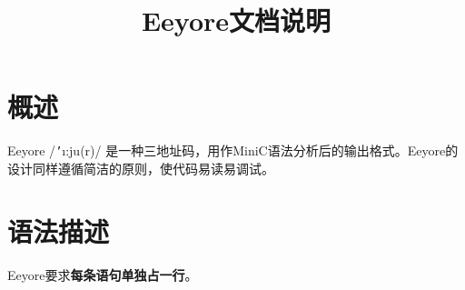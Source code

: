 \documentclass{ctexart}
\title{Eeyore文档说明}
\date{}
\author{}
\begin{document}
\maketitle

\section{概述}
Eeyore /\texttt{'}\i:ju\textschwa(r)/ 是一种三地址码，用作MiniC语法分析后的输出格式。Eeyore的设计同样遵循简洁的原则，使代码易读易调试。



\section{语法描述}
Eeyore要求\textbf{每条语句单独占一行}。
\end{document}
